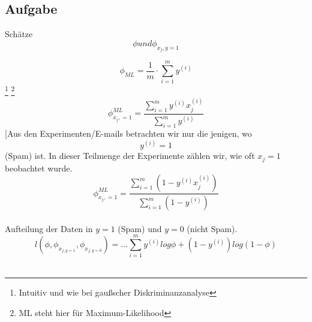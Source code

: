 \subsection*{Aufgabe }

Schätze \[ \phi und \phi_{x_j,y=1} \]

\[ \phi_{ML} = \frac{1}{m} \cdot \sum_{i=1}^{m} y^{(i)} \]\footnote{Intuitiv und wie bei gaußscher Diskriminanzanalyse}
\footnote{ML steht hier für Maximum-Likelihood} \\

\[ \phi_{x_j,=1}^{ML} = \frac{\sum_{i=1}^{m} y^{(i)}x_{j}^{(i)} }{\sum_{i=1}^{m} y^{(i)}} \] [Aus den Experimenten/E-mails betrachten wir nur die jenigen, wo \[ y^{(i)} = 1 \] (Spam) ist. In dieser Teilmenge der Experimente zählen wir, wie oft $x_j = 1$ beobachtet wurde.\\

\[ \phi_{x_j,=1}^{ML} = \frac{ \sum_{i=1}^{m}( 1 - y^{(i)}x_{j}^{(i)} ) }{ \sum_{i=1}^{m}( 1 - y^{(i)} ) } \] \\
Aufteilung der Daten in $y=1$ (Spam) und $y=0$ (nicht Spam).\\

\[ l(\phi, \phi_{x_{j,y=1}},  \phi_{x_{j,y=0}}) = ...  \sum_{i=1}^{m} y^{(i)} log\phi + (1 - y^{(i)}) log(1 - \phi) \] \\
